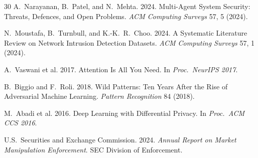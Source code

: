 \documentclass[sigconf,nonacm]{acmart}
\begin{document}
\begin{thebibliography}{30}
A.~Narayanan, B.~Patel, and N.~Mehta. 2024. Multi-Agent System
Security: Threats, Defences, and Open Problems.
\textit{ACM Computing Surveys} 57, 5 (2024).

N.~Moustafa, B.~Turnbull, and K.-K.~R.~Choo. 2024. A Systematic
Literature Review on Network Intrusion Detection Datasets.
\textit{ACM Computing Surveys} 57, 1 (2024).

A.~Vaswani et al. 2017. Attention Is All You Need.
In \textit{Proc.\ NeurIPS 2017}.

B.~Biggio and F.~Roli. 2018. Wild Patterns: Ten Years After the
Rise of Adversarial Machine Learning. \textit{Pattern Recognition}
84 (2018).

M.~Abadi et al. 2016. Deep Learning with Differential Privacy.
In \textit{Proc.\ ACM CCS 2016}.

U.S.~Securities and Exchange Commission. 2024. \textit{Annual
Report on Market Manipulation Enforcement}. SEC Division of
Enforcement.

\end{thebibliography}
\end{document}
